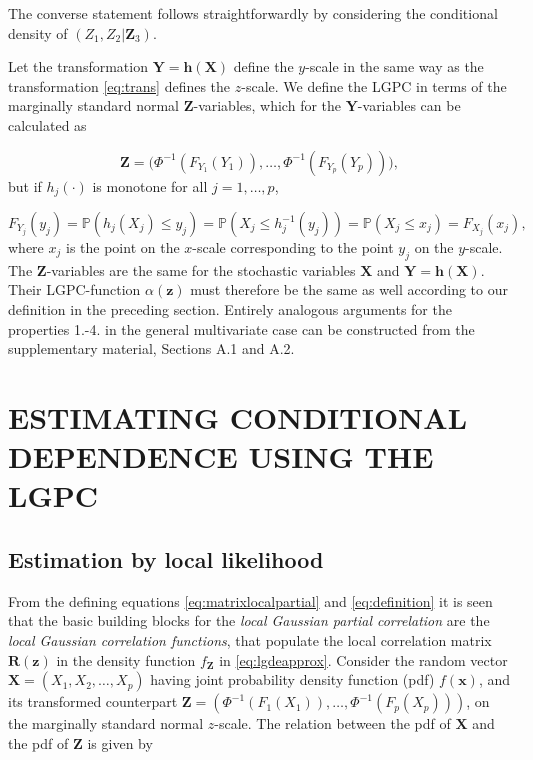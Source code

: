 \documentclass[
  12pt,
  letterpaper]{article}
\newcommand{\X}{\bm{X}}
\newcommand{\x}{\bm{x}}
\newcommand{\Z}{\bm{Z}}
\newcommand{\z}{\bm{z}}
\newcommand{\Y}{\bm{Y}}
\newcommand{\R}{\bm{R}}
\theoremstyle{definition}
\theoremstyle{definition}
\theoremstyle{definition}
\theoremstyle{remark}
\begin{document}
The converse statement follows straightforwardly by considering the conditional density of \((Z_1, Z_2|\Z_3)\).

Let the transformation \(\Y = \bm{h}(\X)\) define the \(y\)-scale in the same way as the transformation \eqref{eq:trans} defines the \(z\)-scale. We define the LGPC in terms of the marginally standard normal \(\Z\)-variables, which for the \(\Y\)-variables can be calculated as

\[\Z = \Big(\Phi^{-1}\left(F_{Y_1}(Y_1)\right), \ldots, \Phi^{-1}\left(F_{Y_p}(Y_p)\right)\Big),\]
but if \(h_j(\cdot)\) is monotone for all \(j = 1,\ldots,p\),

\[F_{Y_j}(y_j) = \mathbb{P}(h_j(X_j) \leq y_j) = \mathbb{P}(X_j \leq h_j^{-1}(y_j)) = \mathbb{P}(X_j \leq x_j) = F_{X_j}(x_j),\]
where \(x_j\) is the point on the \(x\)-scale corresponding to the point \(y_j\) on the \(y\)-scale. The \(\Z\)-variables are the same for the stochastic variables \(\X\) and \(\Y = \bm{h}(\X)\). Their LGPC-function \(\alpha(\z)\) must therefore be the same as well according to our definition in the preceding section. Entirely analogous arguments for the properties 1.-4. in the general multivariate case can be constructed from the supplementary material, Sections A.1 and A.2.

\hypertarget{chap:estimation}{%
\section{ESTIMATING CONDITIONAL DEPENDENCE USING THE LGPC}\label{chap:estimation}}

\hypertarget{ll}{%
\subsection{Estimation by local likelihood}\label{ll}}

From the defining equations \eqref{eq:matrixlocalpartial} and \eqref{eq:definition} it is seen that the basic building blocks for the \emph{local Gaussian partial correlation} are the \emph{local Gaussian correlation functions}, that populate the local correlation matrix \(\R(\z)\) in the density function \(f_{\Z}\) in \eqref{eq:lgdeapprox}. Consider the random vector \(\X = (X_1, X_2, \ldots, X_p)\) having joint probability density function (pdf) \(f(\x)\), and its transformed counterpart \(\Z = \left(\Phi^{-1}(F_1(X_1)), \ldots, \Phi^{-1}(F_p(X_p))\right)\), on the marginally standard normal \(z\)-scale. The relation between the pdf of \(\X\) and the pdf of \(\Z\) is given by
\end{document}
